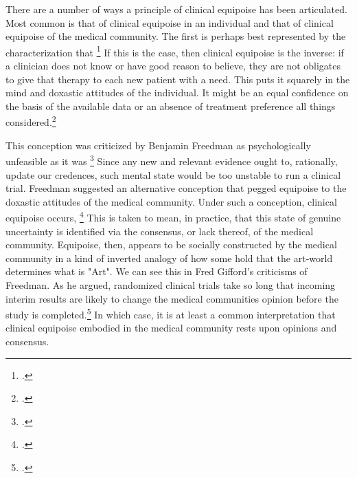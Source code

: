 \documentclass[letterpaper,notitlepage,12pt]{article}
\begin{document}
There are a number of ways a principle of clinical
equipoise has been articulated.
Most common is that of clinical equipoise in an individual and that of clinical
equipoise of the medical community.
The first is perhaps best represented by the characterization that \footcite{shaw1970}
If this is the case, then clinical equipoise is the inverse: if a clinician does
not know or have good reason to believe, they are not obligates to give that
therapy to each new patient with a need.
This puts it squarely in the mind and doxastic attitudes of the individual.
It might be an equal confidence on the basis
of the available data or an absence of treatment preference all things
considered.\footcite{fried1974}

This conception was criticized by Benjamin Freedman as psychologically
unfeasible as it was \footcite[p. 143]
{freedman1987}
Since any new and relevant evidence ought to, rationally, update our credences,
such mental state would be too unstable to run a clinical trial.
Freedman suggested an alternative conception that pegged equipoise to the
doxastic attitudes of the medical community.
Under such a conception, clinical equipoise occurs, \footcite{freedman1987}
This is taken to mean, in practice, that this state of genuine uncertainty is
identified via the consensus, or lack thereof, of the medical community.
Equipoise, then, appears to be socially constructed by the medical community in
a kind of inverted analogy of how some hold that the art-world determines what
is "Art".
We can see this in Fred Gifford's criticisms of Freedman.
As he argued, randomized clinical trials take so long that incoming interim
results are likely to change the medical communities opinion before the study is
completed.\footcite[p. 129]{gifford1995}
In which case, it is at least a common interpretation that clinical equipoise
embodied in the medical community rests upon opinions and consensus.
\end{document}
